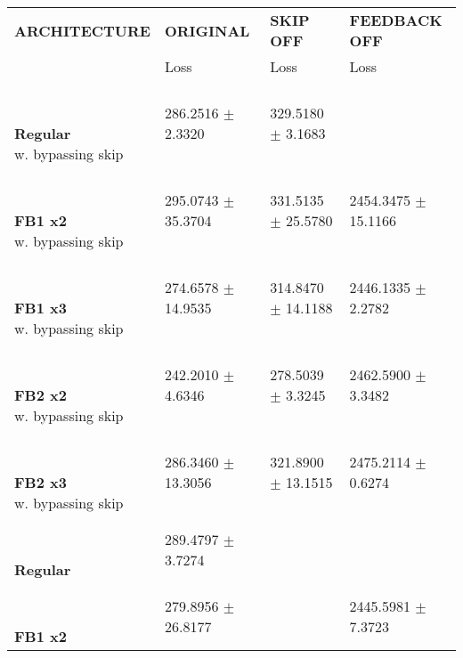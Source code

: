 
\begin{table}[ht]
    \centering
    \begin{tabular}{|>{\columncolor{gray!05}}l|l|l|l|}
        \hline
        \rowcolor{gray!20}
        \textbf{\footnotesize ARCHITECTURE} & \textbf{\footnotesize ORIGINAL} & \textbf{\footnotesize SKIP OFF} & \textbf{\footnotesize FEEDBACK OFF} \\

        \rowcolor{gray!20}
        & {\footnotesize Loss} & {\footnotesize Loss} & {\footnotesize Loss} \\
        \hline
\shortstack[l]{\\ {} \\ \textbf{Regular}\\{w. bypassing skip}} & 286.2516 $\pm$ 2.3320 & 329.5180 $\pm$ 3.1683 &  \\
 \hline 
\shortstack[l]{\\ {} \\ \textbf{FB1 x2}\\{w. bypassing skip}} & 295.0743 $\pm$ 35.3704 & 331.5135 $\pm$ 25.5780 & 2454.3475 $\pm$ 15.1166 \\
 \hline 
\shortstack[l]{\\ {} \\ \textbf{FB1 x3}\\{w. bypassing skip}} & 274.6578 $\pm$ 14.9535 & 314.8470 $\pm$ 14.1188 & 2446.1335 $\pm$ 2.2782 \\
 \hline 
\shortstack[l]{\\ {} \\ \textbf{FB2 x2}\\{w. bypassing skip}} & 242.2010 $\pm$ 4.6346 & 278.5039 $\pm$ 3.3245 & 2462.5900 $\pm$ 3.3482 \\
 \hline 
\shortstack[l]{\\ {} \\ \textbf{FB2 x3}\\{w. bypassing skip}} & 286.3460 $\pm$ 13.3056 & 321.8900 $\pm$ 13.1515 & 2475.2114 $\pm$ 0.6274 \\
 \hline 
\shortstack[l]{\\ {} \\ \textbf{Regular}\\{}} & 289.4797 $\pm$ 3.7274 &  &  \\
 \hline 
\shortstack[l]{\\ {} \\ \textbf{FB1 x2}\\{}} & 279.8956 $\pm$ 26.8177 &  & 2445.5981 $\pm$ 7.3723 \\

\end{tabular}
\end{table}
